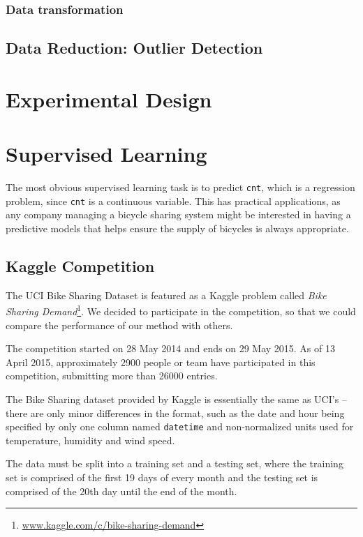 \documentclass[12pt]{article}
\begin{document}
\subsubsection{Data transformation}

\subsection{Data Reduction: Outlier Detection}






\section{Experimental Design}
\label{sec:experimental-design}


\section{Supervised Learning}

The most obvious supervised learning task is to predict \texttt{cnt}, which is a regression problem, since \texttt{cnt} is a continuous variable. This has practical applications, as any company managing a bicycle sharing system might be interested in having a predictive models that helps ensure the supply of bicycles is always appropriate.

\subsection{Kaggle Competition}

The UCI Bike Sharing Dataset is featured as a Kaggle problem called \emph{Bike Sharing Demand}\footnote{\url{www.kaggle.com/c/bike-sharing-demand}}. We decided to participate in the competition, so that we could compare the performance of our method with others.

The competition started on 28 May 2014 and ends on 29 May 2015. As of 13 April 2015, approximately 2900 people or team have participated in this competition, submitting more than 26000 entries.

The Bike Sharing dataset provided by Kaggle is essentially the same as UCI's -- there are only minor differences in the format, such as the date and hour being specified by only one column named \texttt{datetime} and non-normalized units used for temperature, humidity and wind speed.

The data must be split into a training set and a testing set, where the training set is comprised of the first 19 days of every month and the testing set is comprised of the 20th day until the end of the month.
\end{document}
